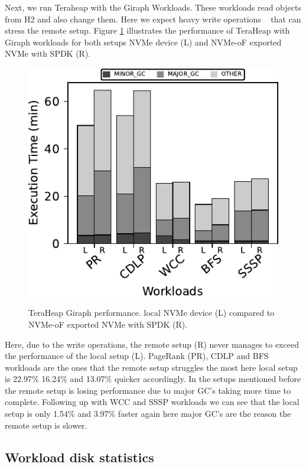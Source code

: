 Next, we run Teraheap with the Giraph Workloads. These workloads read objects from H2 and also change them. Here we expect heavy write operations ~\cite{giraph,teraheap} that can stress the remote setup. Figure \ref{fig:bench_giraph} illustrates the performance of TeraHeap with Giraph workloads for both setups NVMe device (L) and NVMe-oF exported NVMe with SPDK (R).
\begin{figure}[H]
  \includegraphics[width=\linewidth]{figures/bench_giraph.pdf}\\
\caption{TeraHeap Giraph performance. local NVMe device (L) compared to NVMe-oF exported NVMe with SPDK (R).}
\label{fig:bench_giraph}
\end{figure}
Here, due to the write operations, the remote setup (R) never manages to exceed the performance of the local setup (L). PageRank (PR), CDLP and BFS workloads are the ones that the remote setup struggles the most here local setup is 22.97\% 16.24\% and 13.07\% quicker accordingly. In the setups mentioned before the remote setup is losing performance due to major GC's taking more time to complete. Following up with WCC and SSSP workloads we can see that the local setup is only 1.54\%	and 3.97\% faster again here major GC's are the reason the remote setup is slower.

\subsection{Workload disk statistics}

